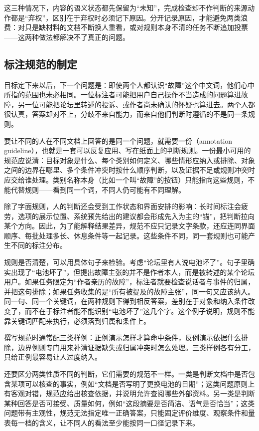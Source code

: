 这三种情况下，内容的语义状态都先保留为“未知”，完成检查却不作判断的来源动作都是“弃权”，区别在于弃权时必须记下原因。分开记录原因，才能避免两类浪费：对只是缺材料的文档不断换人重看，或对规则本身不清的任务不断追加投票——这两种做法都解决不了真正的问题。

\Needspace{95mm}
\subsection{标注规范的制定}
\label{sec:knowledge-acquisition-human-guideline}

目标定下来以后，下一个问题是：即使两个人都认识“故障”这个中文词，他们心中所指的范围也未必相同。一位标注者可能把用户自己操作不当造成的问题算进故障，另一位可能把论坛里转述的投诉、或作者尚未确认的怀疑也算进去。两个人都很认真，答案却对不上，分歧不来自能力，而来自他们判断时遵循的不是同一条规则。

要让不同的人在不同文档上回答的是同一个问题，就需要一份（annotation guideline），也就是一套可以反复应用、写在纸面上的判断规则。一份最小可用的规范应说清：目标对象是什么、每个类别如何定义、哪些情形应纳入或排除、对象之间的边界在哪里、多个条件冲突时按什么顺序判断，以及证据不足或规则冲突时应交给谁处理。类别名称本身（比如一个叫“故障”的按钮）只能指向这些规则，不能代替规则——看到同一个词，不同人仍可能有不同理解。

除了字面规则，人的判断还会受到工作状态和界面安排的影响：长时间标注会疲劳，选项的展示位置、系统预先给出的建议都会形成先入为主的“锚”，把判断拉向某个方向。因此，为了能解释结果差异，规范不应只记录文字条款，还应连同界面顺序、每批处理多长、休息条件等一起记录。这些条件不同，同一套规则也可能产生不同的标注分布。

规则是否清楚，可以用具体句子来检验。考虑“论坛里有人说电池坏了”。句子里确实出现了“电池坏了”，但提出故障主张的并不是作者本人，而是被转述的某个论坛用户。如果任务限定为“作者亲历的故障”，标注者就要检查说话者与事件的归属，并把这句排除；如果任务收集的是“所有被提及的故障主张”，同一句又应该纳入。同一句、同一个关键词，在两种规则下得到相反答案，差别在于对象和纳入条件改变了，而不在于标注者能不能识别“电池坏了”这几个字。这个例子说明，规则不能靠关键词匹配来执行，必须落到归属和条件上。

撰写规范时通常配三类样例：正例演示怎样才算命中条件，反例演示依据什么排除，边界例则专门用来补清证据缺失或归属冲突时怎么处理。三类样例各有分工，只给正例最容易让人过度纳入。

还要区分两类性质不同的判断，它们需要的规范不一样。一类是判断文档中是否包含某项可以核查的事实，例如“文档是否写明了更换电池的日期”；这类问题原则上有客观对错，规范应给出核查依据，并说明允许查阅哪些外部资料。另一类是判断某种回答是否可接受、质量如何，例如“这段摘要是否简洁、语气是否恰当”；这类问题带有主观性，规范无法指定唯一正确答案，只能固定评价维度、观察条件和量表每一档的含义，让不同人的看法至少能按同一口径记录下来。

